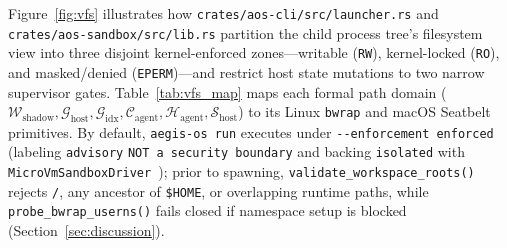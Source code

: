 \documentclass[10pt,journal,compsoc]{IEEEtran}
\begin{document}
Figure~\ref{fig:vfs} illustrates how \texttt{crates/\allowbreak aos-cli/\allowbreak src/\allowbreak launcher.rs} and \texttt{crates/\allowbreak aos-sandbox/\allowbreak src/\allowbreak lib.rs} partition the child process tree's filesystem view into three disjoint kernel-enforced zones---writable (\texttt{RW}), kernel-locked (\texttt{RO}), and masked/denied (\texttt{EPERM})---and restrict host state mutations to two narrow supervisor gates. Table~\ref{tab:vfs_map} maps each formal path domain ($\mathcal{W}_{\text{shadow}}, \mathcal{G}_{\text{host}}, \mathcal{G}_{\text{idx}}, \mathcal{C}_{\text{agent}}, \mathcal{H}_{\text{agent}}, \mathcal{S}_{\text{host}}$) to its Linux \texttt{bwrap} and macOS Seatbelt primitives. By default, \texttt{aegis-os run} executes under \texttt{-\/-enforcement enforced} (labeling \texttt{advisory} \texttt{NOT a security boundary} and backing \texttt{isolated} with \texttt{MicroVmSandboxDriver}~\cite{agache2020firecracker}); prior to spawning, \texttt{validate\_workspace\_roots()} rejects \texttt{/}, any ancestor of \texttt{\$HOME}, or overlapping runtime paths, while \texttt{probe\_bwrap\_userns()} fails closed if namespace setup is blocked (Section~\ref{sec:discussion}).
\end{document}
